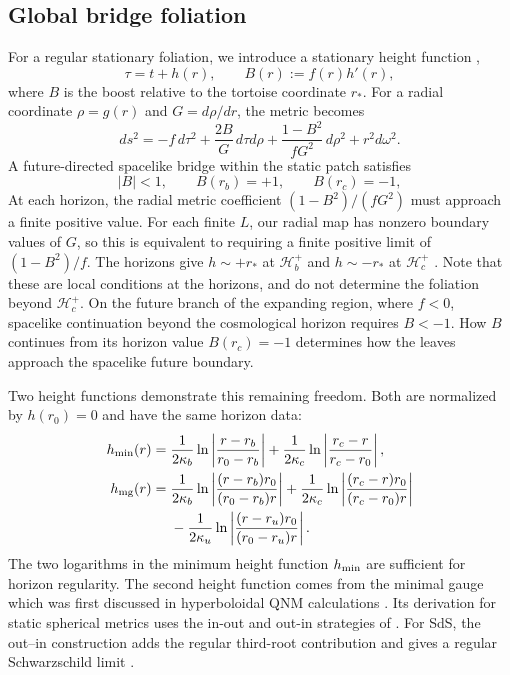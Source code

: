 \documentclass[
 aps,
 prd,
 reprint,
 superscriptaddress,
 nofootinbib,
 longbibliography
]{revtex4-2}
\newcommand{\hc}{\mathcal{H}_{c}^{+}}
\newcommand{\hb}{\mathcal{H}_{b}^{+}}
\begin{document}
\subsection{Global bridge foliation}

For a regular stationary foliation, we introduce a
stationary height function \cite{zenginoglu_hyperboloidal_2008,zenginoglu_bridge_2025},
\begin{equation}
 \tau=t+h(r),\qquad B(r):=f(r)h'(r),
 \label{eq:height}
\end{equation}
where $B$ is the boost relative to the tortoise coordinate $r_*$.  For a radial coordinate
$\rho=g(r)$ and $G=d\rho/dr$, the metric becomes
\begin{equation}
 ds^2=-f\,d\tau^2+\frac{2B}{G}\,d\tau d\rho
 +\frac{1-B^2}{fG^2}\,d\rho^2+r^2d\omega^2.
 \label{eq:transformed_metric}
\end{equation}
A future-directed spacelike bridge within the static patch satisfies
\begin{equation}
 |B|<1,\qquad B(r_b)=+1,\qquad B(r_c)=-1,
\label{eq:boost_conditions}
\end{equation}
At each horizon, the radial metric coefficient $(1-B^2)/(fG^2)$ must
approach a finite positive value.  For each finite $L$, our radial map has
nonzero boundary values of $G$, so this is equivalent to requiring a finite
positive limit of $(1-B^2)/f$.  
The horizons give $h\sim+r_*$ at $\hb$ and
$h\sim-r_*$ at $\hc$ \cite{zenginoglu_bridge_2025}. Note that these are local conditions at the horizons, and do not determine the foliation beyond $\hc$.  On the future
branch of the expanding region, where $f<0$, spacelike continuation beyond the cosmological horizon requires
$B<-1$.  How $B$ continues from its horizon value $B(r_c)=-1$ determines how the leaves approach the spacelike future boundary.  

Two height functions demonstrate this remaining freedom.  Both are normalized
by $h(r_0)=0$ and have the same horizon data:
\begin{align}
h_{\rm min}(r)={}&
\frac{1}{2\kappa_b}\ln\left|\frac{r-r_b}{r_0-r_b}\right|
+\frac{1}{2\kappa_c}\ln\left|\frac{r_c-r}{r_c-r_0}\right|,
\label{eq:minimum_height}\\
h_{\rm mg}(r)={}&
\frac{1}{2\kappa_b}
\ln\left|\frac{(r-r_b)r_0}{(r_0-r_b)r}\right|
+\frac{1}{2\kappa_c}
\ln\left|\frac{(r_c-r)r_0}{(r_c-r_0)r}\right|
\notag\\
&-\frac{1}{2\kappa_u}
\ln\left|\frac{(r-r_u)r_0}{(r_0-r_u)r}\right|.
\label{eq:minimal_height}
\end{align}
The two logarithms in the minimum height function $h_{\rm min}$ are sufficient for horizon regularity. The second height function comes from the minimal gauge which was first discussed in hyperboloidal QNM calculations \cite{AnsorgMacedo:2016,MacedoJaramilloAnsorg:2018, Macedo:2020}.  Its derivation for static spherical metrics uses the in-out and out-in strategies of \cite{PanossoMacedo:2023qzp}.  For SdS, the out--in construction adds the regular third-root contribution and gives a regular Schwarzschild limit \cite{ZhouPanossoMacedo:2025}.
\end{document}
